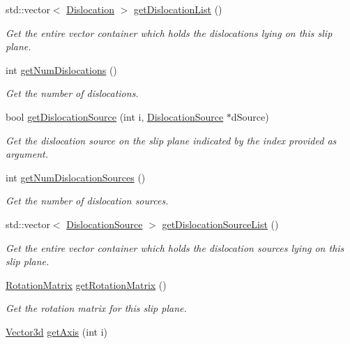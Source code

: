 \begin{DoxyCompactItemize}
std\-::vector$<$ \hyperlink{classDislocation}{Dislocation} $>$ \hyperlink{classSlipPlane_aeaa4af766101e8bb21d557acd10c7cf6}{get\-Dislocation\-List} ()
\begin{DoxyCompactList}\small\item\em Get the entire vector container which holds the dislocations lying on this slip plane. \end{DoxyCompactList}\item 
int \hyperlink{classSlipPlane_a0034812f46524ee8b685d0564e2e4e38}{get\-Num\-Dislocations} ()
\begin{DoxyCompactList}\small\item\em Get the number of dislocations. \end{DoxyCompactList}\item 
bool \hyperlink{classSlipPlane_a9829ea40c2c647cbee1f238c680295a1}{get\-Dislocation\-Source} (int i, \hyperlink{classDislocationSource}{Dislocation\-Source} $\ast$d\-Source)
\begin{DoxyCompactList}\small\item\em Get the dislocation source on the slip plane indicated by the index provided as argument. \end{DoxyCompactList}\item 
int \hyperlink{classSlipPlane_aa2fc300c7d06a883be6f35c75dc169c7}{get\-Num\-Dislocation\-Sources} ()
\begin{DoxyCompactList}\small\item\em Get the number of dislocation sources. \end{DoxyCompactList}\item 
std\-::vector$<$ \hyperlink{classDislocationSource}{Dislocation\-Source} $>$ \hyperlink{classSlipPlane_afcda214ca418f8becaaf4f3d13c46d82}{get\-Dislocation\-Source\-List} ()
\begin{DoxyCompactList}\small\item\em Get the entire vector container which holds the dislocation sources lying on this slip plane. \end{DoxyCompactList}\item 
\hyperlink{classRotationMatrix}{Rotation\-Matrix} \hyperlink{classSlipPlane_af61e666e8704b1442eb8b5c1699e9071}{get\-Rotation\-Matrix} ()
\begin{DoxyCompactList}\small\item\em Get the rotation matrix for this slip plane. \end{DoxyCompactList}\item 
\hyperlink{classVector3d}{Vector3d} \hyperlink{classSlipPlane_a2e0139563665d1765f04582bfeebabc9}{get\-Axis} (int i)

\end{DoxyCompactItemize}
